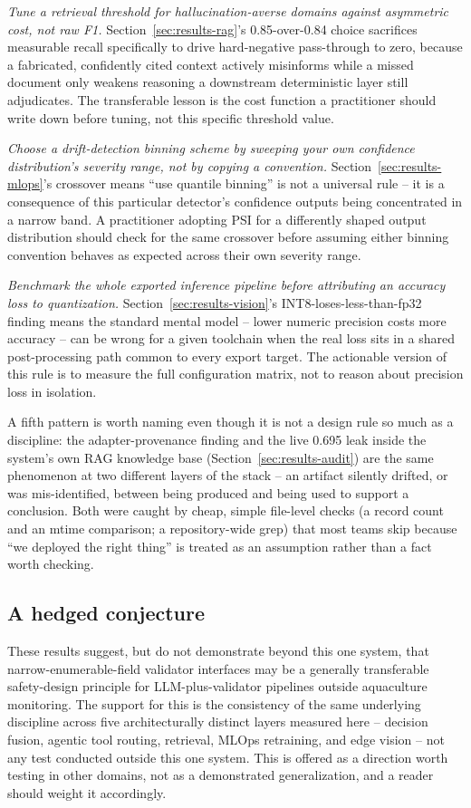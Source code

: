 \emph{Tune a retrieval threshold for hallucination-averse domains against asymmetric cost, not raw
F1.} Section~\ref{sec:results-rag}'s 0.85-over-0.84 choice sacrifices measurable recall
specifically to drive hard-negative pass-through to zero, because a fabricated, confidently cited
context actively misinforms while a missed document only weakens reasoning a downstream
deterministic layer still adjudicates. The transferable lesson is the cost function a practitioner
should write down before tuning, not this specific threshold value.

\emph{Choose a drift-detection binning scheme by sweeping your own confidence distribution's
severity range, not by copying a convention.} Section~\ref{sec:results-mlops}'s crossover means
``use quantile binning'' is not a universal rule -- it is a consequence of this particular
detector's confidence outputs being concentrated in a narrow band. A practitioner adopting PSI for
a differently shaped output distribution should check for the same crossover before assuming either
binning convention behaves as expected across their own severity range.

\emph{Benchmark the whole exported inference pipeline before attributing an accuracy loss to
quantization.} Section~\ref{sec:results-vision}'s INT8-loses-less-than-fp32 finding means the
standard mental model -- lower numeric precision costs more accuracy -- can be wrong for a given
toolchain when the real loss sits in a shared post-processing path common to every export target.
The actionable version of this rule is to measure the full configuration matrix, not to reason
about precision loss in isolation.

A fifth pattern is worth naming even though it is not a design rule so much as a discipline: the
adapter-provenance finding and the live 0.695 leak inside the system's own RAG knowledge base
(Section~\ref{sec:results-audit}) are the same phenomenon at two different layers of the stack --
an artifact silently drifted, or was mis-identified, between being produced and being used to
support a conclusion. Both were caught by cheap, simple file-level checks (a record count and an
mtime comparison; a repository-wide grep) that most teams skip because ``we deployed the right
thing'' is treated as an assumption rather than a fact worth checking.

\subsection{A hedged conjecture}

These results suggest, but do not demonstrate beyond this one system, that narrow-enumerable-field
validator interfaces may be a generally transferable safety-design principle for LLM-plus-validator
pipelines outside aquaculture monitoring. The support for this is the consistency of the same
underlying discipline across five architecturally distinct layers measured here -- decision fusion,
agentic tool routing, retrieval, MLOps retraining, and edge vision -- not any test conducted outside
this one system. This is offered as a direction worth testing in other domains, not as a
demonstrated generalization, and a reader should weight it accordingly.
